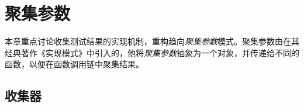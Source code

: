 \begin{savequote}[45mm]
\end{savequote}

\chapter{聚集参数} 
\label{ch:param-collector}

\begin{content}

本章重点讨论收集测试结果的实现机制，重构趋向\emph{聚集参数}模式。聚集参数由在其经典著作《实现模式》中引入的，他将\emph{聚集参数}抽象为一个对象，并传递给不同的函数，以便在函数调用链中聚集结果。

\end{content}

\section{收集器}


